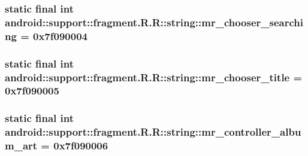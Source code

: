 \hypertarget{classandroid_1_1support_1_1fragment_1_1_r_1_1string_63f2565c4d86540fb760b1b72d4b6c95}{
\subsubsection[{mr\_\-chooser\_\-searching}]{\setlength{\rightskip}{0pt plus 5cm}static final int android::support::fragment.R.R::string::mr\_\-chooser\_\-searching = 0x7f090004}}
\label{classandroid_1_1support_1_1fragment_1_1_r_1_1string_63f2565c4d86540fb760b1b72d4b6c95}


\hypertarget{classandroid_1_1support_1_1fragment_1_1_r_1_1string_4ff948f6b35239c4b089dae9d442ae85}{
\subsubsection[{mr\_\-chooser\_\-title}]{\setlength{\rightskip}{0pt plus 5cm}static final int android::support::fragment.R.R::string::mr\_\-chooser\_\-title = 0x7f090005}}
\label{classandroid_1_1support_1_1fragment_1_1_r_1_1string_4ff948f6b35239c4b089dae9d442ae85}


\hypertarget{classandroid_1_1support_1_1fragment_1_1_r_1_1string_39dd7e35dee745daa7e4c6ff3d5a4ad7}{
\subsubsection[{mr\_\-controller\_\-album\_\-art}]{\setlength{\rightskip}{0pt plus 5cm}static final int android::support::fragment.R.R::string::mr\_\-controller\_\-album\_\-art = 0x7f090006}}
\label{classandroid_1_1support_1_1fragment_1_1_r_1_1string_39dd7e35dee745daa7e4c6ff3d5a4ad7}


